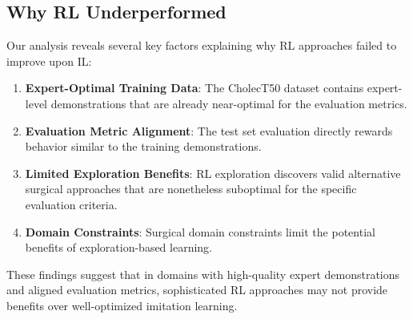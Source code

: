 \subsection{Why RL Underperformed}

Our analysis reveals several key factors explaining why RL approaches failed to improve upon IL:

\begin{enumerate}
\item \textbf{Expert-Optimal Training Data}: The CholecT50 dataset contains expert-level demonstrations that are already near-optimal for the evaluation metrics.
\item \textbf{Evaluation Metric Alignment}: The test set evaluation directly rewards behavior similar to the training demonstrations.
\item \textbf{Limited Exploration Benefits}: RL exploration discovers valid alternative surgical approaches that are nonetheless suboptimal for the specific evaluation criteria.
\item \textbf{Domain Constraints}: Surgical domain constraints limit the potential benefits of exploration-based learning.
\end{enumerate}

These findings suggest that in domains with high-quality expert demonstrations and aligned evaluation metrics, sophisticated RL approaches may not provide benefits over well-optimized imitation learning.

